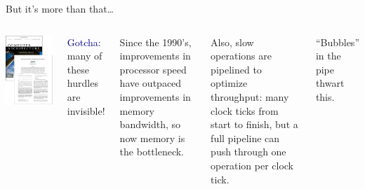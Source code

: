 \documentclass{beamer}
\begin{document}
\begin{frame}{But it's more than that\ldots}
\vspace{0.5 cm}
\begin{columns}
\includegraphics[width=\linewidth]{books.png}

\textcolor{darkblue}{Gotcha:} many of these hurdles are invisible!

\vspace{0.5 cm}
Since the 1990's, improvements in processor speed have outpaced improvements in memory bandwidth, so now memory is the bottleneck.

\vspace{0.5 cm}
Also, slow operations are pipelined to optimize throughput: many clock ticks from start to finish, but a full pipeline can push through one operation per clock tick.

\vspace{0.5 cm}
``Bubbles'' in the pipe thwart this.
\end{columns}
\end{frame}
\end{document}
